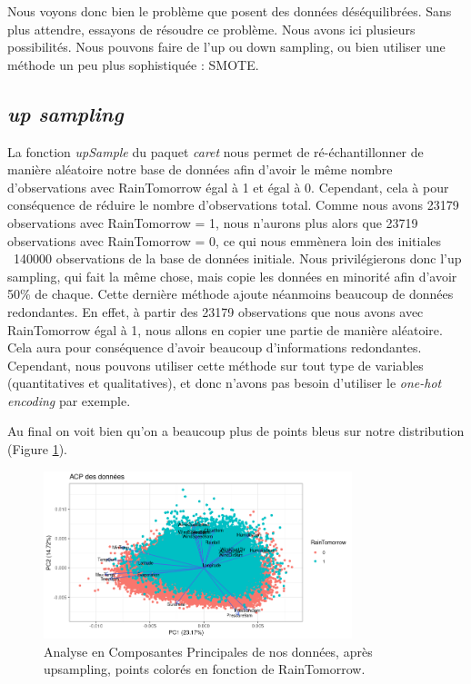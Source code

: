 \documentclass{article}
\begin{document}
Nous voyons donc bien le problème que posent des données déséquilibrées. Sans plus attendre, essayons de résoudre ce problème. Nous avons ici plusieurs possibilités. Nous pouvons faire de l'up ou down sampling, ou bien utiliser une méthode un peu plus sophistiquée : SMOTE.

\subsection{\emph{up sampling}}

La fonction \emph{upSample} du paquet \emph{caret} nous permet de ré-échantillonner de manière aléatoire notre base de données afin d'avoir le même nombre d'observations avec RainTomorrow égal à 1 et égal à 0. Cependant, cela à pour conséquence de réduire le nombre d'observations total. Comme nous avons 23179 observations avec RainTomorrow = 1, nous n'aurons plus alors que 23719 observations avec RainTomorrow = 0, ce qui nous emmènera loin des initiales ~140000 observations de la base de données initiale. Nous privilégierons donc l'up sampling, qui fait la même chose, mais copie les données en minorité afin d'avoir 50\% de chaque. Cette dernière méthode ajoute néanmoins beaucoup de données redondantes. En effet, à partir des 23179 observations que nous avons avec RainTomorrow égal à 1, nous allons en copier une partie de manière aléatoire. Cela aura pour conséquence d'avoir beaucoup d'informations redondantes. Cependant, nous pouvons utiliser cette méthode sur tout type de variables (quantitatives et qualitatives), et donc n'avons pas besoin d'utiliser le \emph{one-hot encoding} par exemple. 

Au final on voit bien qu'on a beaucoup plus de points bleus sur notre distribution (Figure \ref{fig:pca_raintomorrow_up}).

\begin{figure}[htp]
    \centering
    \includegraphics[width=0.8\textwidth]{Images/pca/pca_up.png}
    \caption{Analyse en Composantes Principales de nos données, après upsampling, points colorés en fonction de RainTomorrow.}
    \label{fig:pca_raintomorrow_up}
\end{figure}
\end{document}
